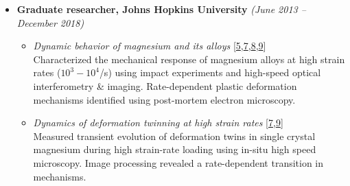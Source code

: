 \documentclass[a4paper,10pt, oneside]{article}
\begin{document}
\begin{itemize}[wide, labelwidth=!, labelindent=-1em]
\begin{itemize}[wide, labelwidth=!, labelindent=0em]
			\item \textit{Polarization switching in ferroelectric ceramics} [\hyperref[eml2022]{2},\hyperref[mat2022]{3}] \\
			Developed in-situ experimental methods to characterize kinetics of polarization switching. Measured and characterized rate-dependent polarization hysteresis and coupled mechanical strains in poled ferroelectric ceramics.
			\item \textit{Wave propagation in architected metamaterials} [\hyperref[jmps2024]{1}] \\
			Measurement and analysis of acoustic wave propagation and dispersion in architected metamaterial plates, using scanning laser doppler vibrometry.		
			\item \textit{Non-linear viscoelastic behavior of architected metamaterials} [\hyperref[jmps2021]{4}] \\
			Developed in-situ experiments and analysis methods to study the non-linear viscoelastic response of truss-based architected metamaterials.
		\end{itemize}
		\vspace*{1em}
		\item[]\textbf{Graduate researcher, Johns Hopkins University} \hfill \textit{(June 2013 -- December 2018)}
		\begin{itemize}[wide, labelwidth=!, labelindent=0em]
			\item \textit{Dynamic behavior of magnesium and its alloys} [\hyperref[jms2019]{5},\hyperref[jmps2018]{7},\hyperref[actmat2018]{8},\hyperref[jdbm2018]{9}]\\
			Characterized the mechanical response of magnesium alloys at high strain rates ($10^{3}-10^{4}$/s) using impact experiments and high-speed  optical interferometry \& imaging. Rate-dependent plastic deformation mechanisms identified using post-mortem electron microscopy. 
			
			\item \textit{Dynamics of deformation twinning at high strain rates} [\hyperref[jmps2018]{7},\hyperref[jdbm2018]{9}] \\
			Measured transient evolution of deformation twins in single crystal magnesium during high strain-rate loading using in-situ high speed microscopy. Image processing revealed a rate-dependent transition in mechanisms.
			

\end{itemize}
\end{itemize}
\end{document}
